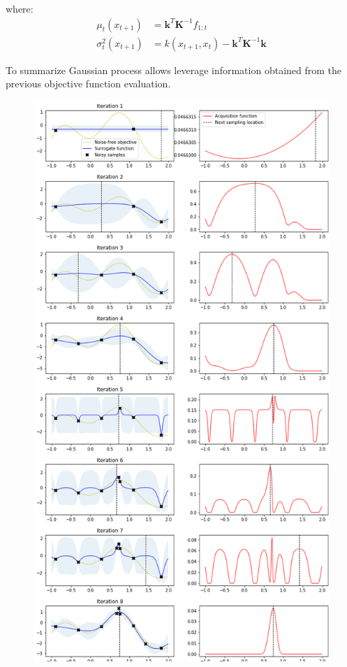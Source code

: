 where: 
\begin{equation*}
\begin{aligned}
    \mu_{t}(x_{t+1}) &= \mathbf{k}^{T}\mathbf{K}^{-1}f_{1:t} \\
     \sigma_{t}^{2}(x_{t+1}) &= k(x_{t+1},x_t) - \mathbf{k}^{T}\mathbf{K}^{-1}\mathbf{k}
     \end{aligned}
\end{equation*}

To summarize Gaussian process allows leverage information obtained from the previous objective function evaluation.


\begin{figure}[!ht]
\centering
\includegraphics[scale=0.6]{figures/BO.png}

\end{figure}
